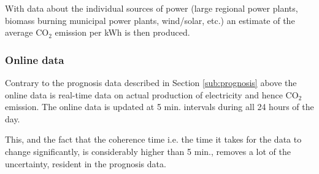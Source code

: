 \documentclass[Main]{subfiles}
\begin{document}
			With data about the individual sources of power (large regional power plants, biomass burning municipal power plants, wind/solar, etc.) an estimate of the average CO$_2$ emission per kWh is then produced.


		\subsubsection{Online data} %
		\label{sub:online_data}
			Contrary to the prognosis data described in Section \ref{sub:prognosis} above the online data is real-time data on actual production of electricity and hence CO$_2$ emission.
			The online data is updated at 5 min. intervals during all 24 hours of the day.

			This, and the fact that the coherence time i.e. the time it takes for the data to change significantly, is considerably higher than 5 min., removes a lot of the uncertainty, resident in the prognosis data.



\end{document}
